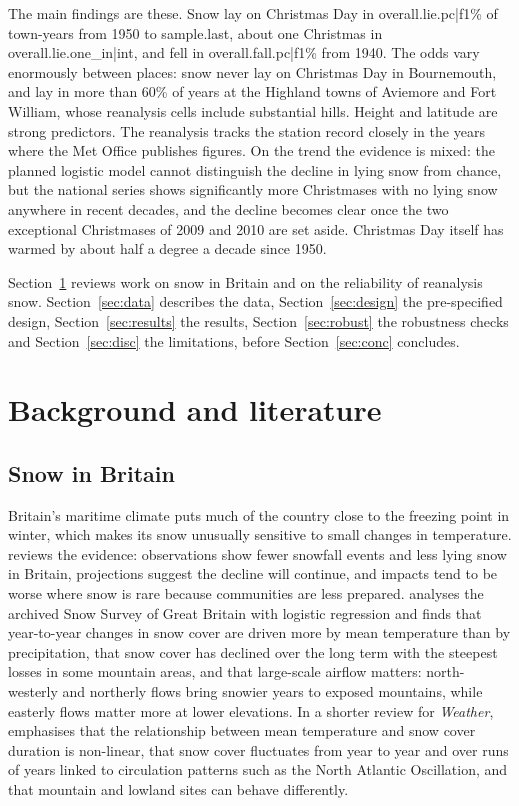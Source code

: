 \documentclass[11pt,a4paper]{article}
\begin{document}
The main findings are these. Snow lay on Christmas Day in {{overall.lie.pc|f1}}\% of town-years from 1950 to {{sample.last}}, about one Christmas in {{overall.lie.one_in|int}}, and fell in {{overall.fall.pc|f1}}\% from 1940. The odds vary enormously between places: snow never lay on Christmas Day in Bournemouth, and lay in more than 60\% of years at the Highland towns of Aviemore and Fort William, whose reanalysis cells include substantial hills. Height and latitude are strong predictors. The reanalysis tracks the station record closely in the years where the Met Office publishes figures. On the trend the evidence is mixed: the planned logistic model cannot distinguish the decline in lying snow from chance, but the national series shows significantly more Christmases with no lying snow anywhere in recent decades, and the decline becomes clear once the two exceptional Christmases of 2009 and 2010 are set aside. Christmas Day itself has warmed by about half a degree a decade since 1950.

Section~\ref{sec:lit} reviews work on snow in Britain and on the reliability of reanalysis snow. Section~\ref{sec:data} describes the data, Section~\ref{sec:design} the pre-specified design, Section~\ref{sec:results} the results, Section~\ref{sec:robust} the robustness checks and Section~\ref{sec:disc} the limitations, before Section~\ref{sec:conc} concludes.

\section{Background and literature}\label{sec:lit}
\subsection{Snow in Britain}
Britain's maritime climate puts much of the country close to the freezing point in winter, which makes its snow unusually sensitive to small changes in temperature. \citet{kay2016} reviews the evidence: observations show fewer snowfall events and less lying snow in Britain, projections suggest the decline will continue, and impacts tend to be worse where snow is rare because communities are less prepared. \citet{brown2019} analyses the archived Snow Survey of Great Britain with logistic regression and finds that year-to-year changes in snow cover are driven more by mean temperature than by precipitation, that snow cover has declined over the long term with the steepest losses in some mountain areas, and that large-scale airflow matters: north-westerly and northerly flows bring snowier years to exposed mountains, while easterly flows matter more at lower elevations. In a shorter review for \textit{Weather}, \citet{brown2020} emphasises that the relationship between mean temperature and snow cover duration is non-linear, that snow cover fluctuates from year to year and over runs of years linked to circulation patterns such as the North Atlantic Oscillation, and that mountain and lowland sites can behave differently.
\end{document}
